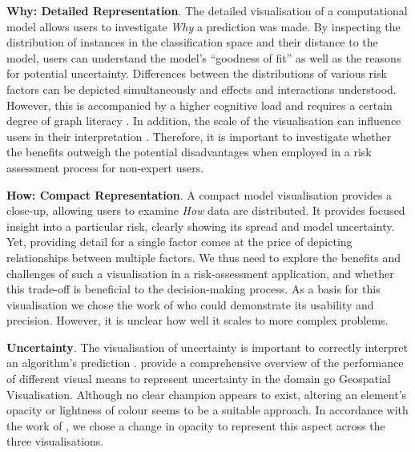 \documentclass[final,5p,times,twocolumn,authoryear]{elsarticle}
\begin{document}
\noindent \textbf{Why: Detailed Representation}.
The detailed visualisation of a computational model allows users to investigate \emph{Why} a prediction was made. By inspecting the distribution of instances in the classification space and their distance to the model, users can understand the model's ``goodness of fit'' as well as the reasons for potential uncertainty. Differences between the distributions of various risk factors can be depicted simultaneously and effects and interactions understood. However, this is accompanied by a higher cognitive load and requires a certain degree of graph literacy \citep{pinker_theory_1990}. In addition, the scale of the visualisation can influence users in their interpretation \citep{cleveland_variables_1982}. Therefore, it is important to investigate whether the benefits outweigh the potential disadvantages when employed in a risk assessment process for non-expert users.


\noindent \textbf{How: Compact Representation}.
A compact model visualisation provides a close-up, allowing users to examine \emph{How} data are distributed. It provides focused insight into a particular risk, clearly showing its spread and model uncertainty. Yet, providing detail for a single factor comes at the price of depicting relationships between multiple factors. We thus need to explore the benefits and challenges of such a visualisation in a risk-assessment application, and whether this trade-off is beneficial to the decision-making process. As a basis for this visualisation we chose the work of \cite{kay_when_2016} who could demonstrate its usability and precision. However, it is unclear how well it scales to more complex problems.

\noindent \textbf{Uncertainty}. %
\label{sub:uncertainty}
The visualisation of uncertainty is important to correctly interpret an algorithm's prediction \cite{skeels2010revealing}. \cite{kinkeldey_how_2014} provide a comprehensive overview of the performance of different visual means to represent uncertainty in the domain go Geospatial Visualisation. Although no clear champion appears to exist, altering an element's opacity or lightness of colour seems to be a suitable approach. In accordance with the work of \citep{davis_modelling_1997}, we chose a change in opacity to represent this aspect across the three visualisations. 

\end{document}
